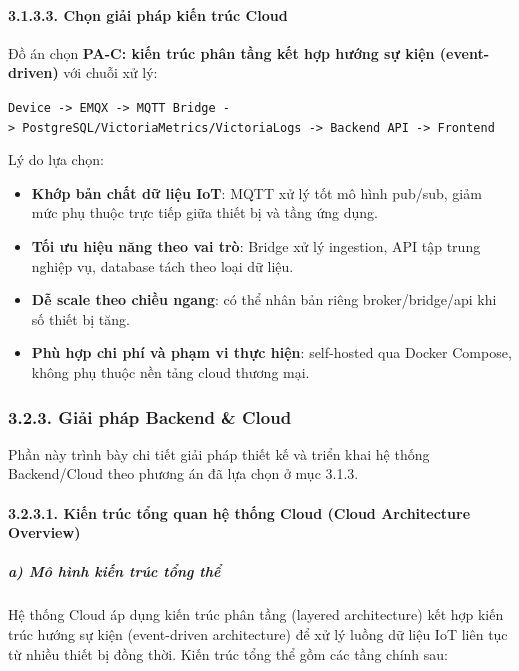 \documentclass[13pt,a4paper]{extarticle}
\renewcommand{\\}{\thesislongtableorignewline\hline}%
\providecommand{\tightlist}{%
  \setlength{\itemsep}{0pt}\setlength{\parskip}{0pt}}
\begin{document}
\paragraph{3.1.3.3. Chọn giải pháp kiến trúc
Cloud}\label{3133-chux1ecdn-giux1ea3i-phuxe1p-kiux1ebfn-truxfac-cloud}

Đồ án chọn \textbf{PA-C: kiến trúc phân tầng kết hợp hướng sự kiện
(event-driven)} với chuỗi xử lý:

\texttt{Device\ -\textgreater{}\ EMQX\ -\textgreater{}\ MQTT\ Bridge\ -\textgreater{}\ PostgreSQL/VictoriaMetrics/VictoriaLogs\ -\textgreater{}\ Backend\ API\ -\textgreater{}\ Frontend}

Lý do lựa chọn:

\begin{itemize}
\tightlist
\item
  \textbf{Khớp bản chất dữ liệu IoT}: MQTT xử lý tốt mô hình pub/sub,
  giảm mức phụ thuộc trực tiếp giữa thiết bị và tầng ứng dụng.
\item
  \textbf{Tối ưu hiệu năng theo vai trò}: Bridge xử lý ingestion, API
  tập trung nghiệp vụ, database tách theo loại dữ liệu.
\item
  \textbf{Dễ scale theo chiều ngang}: có thể nhân bản riêng
  broker/bridge/api khi số thiết bị tăng.
\item
  \textbf{Phù hợp chi phí và phạm vi thực hiện}: self-hosted qua Docker
  Compose, không phụ thuộc nền tảng cloud thương mại.
\end{itemize}

\subsubsection{3.2.3. Giải pháp Backend \&
Cloud}\label{323-giux1ea3i-phuxe1p-backend--cloud}

Phần này trình bày chi tiết giải pháp thiết kế và triển khai hệ thống
Backend/Cloud theo phương án đã lựa chọn ở mục 3.1.3.

\paragraph{3.2.3.1. Kiến trúc tổng quan hệ thống Cloud (Cloud
Architecture
Overview)}\label{3231-kiux1ebfn-truxfac-tux1ed5ng-quan-hux1ec7-thux1ed1ng-cloud-cloud-architecture-overview}

\subparagraph{a) Mô hình kiến trúc tổng
thể}\label{a-muxf4-huxecnh-kiux1ebfn-truxfac-tux1ed5ng-thux1ec3}

Hệ thống Cloud áp dụng kiến trúc phân tầng (layered architecture) kết
hợp kiến trúc hướng sự kiện (event-driven architecture) để xử lý luồng
dữ liệu IoT liên tục từ nhiều thiết bị đồng thời. Kiến trúc tổng thể gồm
các tầng chính sau:
\end{document}
